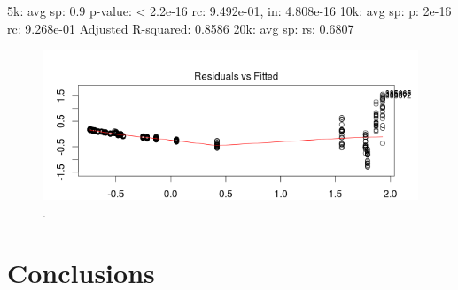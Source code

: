 5k: avg sp:  0.9 p-value: < 2.2e-16 rc: 9.492e-01, in: 4.808e-16
10k: avg sp:  p: 2e-16  rc: 9.268e-01 Adjusted R-squared:  0.8586 
20k: avg sp:  rs: 0.6807 

\begin{figure}[!ht]
	\centering
	\includegraphics[width=160mm, keepaspectratio]{figures/residuals_blaze_q1.png}
	\caption{.}
	\label{fig:residual_blaze_q1}
\end{figure}

\section{Conclusions}